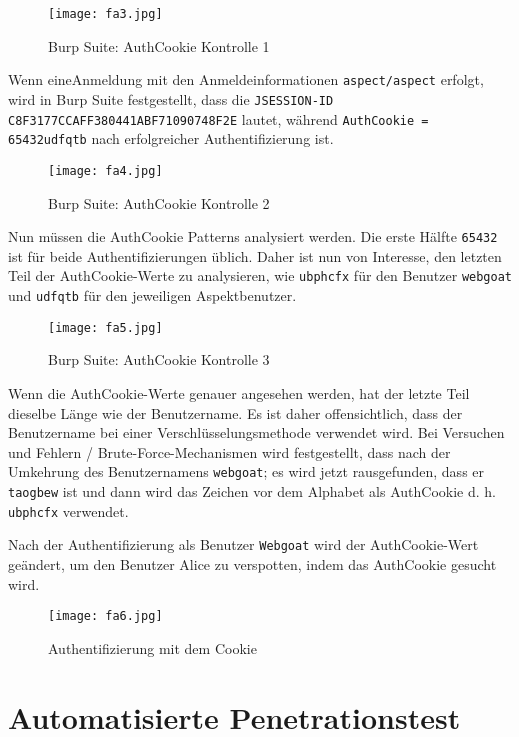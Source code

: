 \begin{figure}[h]
	\centering
	\texttt{[image: fa3.jpg]}
	\caption{Burp Suite: AuthCookie Kontrolle 1}
\end{figure}

Wenn eineAnmeldung mit den Anmeldeinformationen \texttt{aspect/aspect} erfolgt, wird in Burp Suite festgestellt, dass die \texttt{JSESSION-ID C8F3177CCAFF380441ABF71090748F2E} lautet, während \texttt{AuthCookie = 65432udfqtb} nach erfolgreicher Authentifizierung ist.

\newpage

\begin{figure}[h]
	\centering
	\texttt{[image: fa4.jpg]}
	\caption{Burp Suite: AuthCookie Kontrolle 2}
\end{figure}

Nun müssen die AuthCookie Patterns analysiert werden. Die erste Hälfte \texttt{65432} ist für beide Authentifizierungen üblich. Daher ist nun von Interesse, den letzten Teil der AuthCookie-Werte zu analysieren, wie \texttt{ubphcfx} für den Benutzer \texttt{webgoat} und \texttt{udfqtb} für den jeweiligen Aspektbenutzer.\\

\begin{figure}[h]
	\centering
	\texttt{[image: fa5.jpg]}
	\caption{Burp Suite: AuthCookie Kontrolle 3}
\end{figure}

Wenn die AuthCookie-Werte genauer angesehen werden, hat der letzte Teil dieselbe Länge wie der Benutzername. Es ist daher offensichtlich, dass der Benutzername bei einer Verschlüsselungsmethode verwendet wird. Bei Versuchen und Fehlern / Brute-Force-Mechanismen wird festgestellt, dass nach der Umkehrung des Benutzernamens \texttt{webgoat}; es wird jetzt rausgefunden, dass er \texttt{taogbew} ist und dann wird das Zeichen vor dem Alphabet als AuthCookie d. h. \texttt{ubphcfx} verwendet.

\newpage

Nach der Authentifizierung als Benutzer \texttt{Webgoat} wird der AuthCookie-Wert geändert, um den Benutzer Alice zu verspotten, indem das AuthCookie gesucht wird.

\begin{figure}[h]
	\centering
	\texttt{[image: fa6.jpg]}
	\caption{Authentifizierung mit dem Cookie}
\end{figure}

\section{Automatisierte Penetrationstest}

